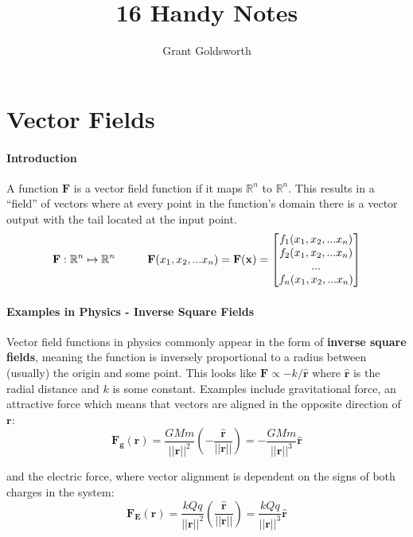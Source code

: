 \documentclass{article}
\title{16 Handy Notes}
\author{Grant Goldsworth}
\date{}
\begin{document}
\maketitle

\newcommand{\parf}[2]{\frac{\partial #1}{\partial #2}}

\section*{Vector Fields}
\paragraph{Introduction} A function $\mathbf{F}$ is a vector field function if it maps $\mathbb{R}^n$ to $\mathbb{R}^n$. This results in a ``field'' of vectors where at every point in the function's domain there is a vector output with the tail located at the input point.
\[ 
    \mathbf{F}: \mathbb{R}^n \mapsto \mathbb{R}^n \hspace{.4in}
    \mathbf{F}(x_1,x_2,...x_n) = \mathbf{F}(\mathbf{x}) = 
    \begin{bmatrix}
        f_1(x_1,x_2,...x_n) \\
        f_2(x_1,x_2,...x_n) \\
        ... \\
        f_n(x_1,x_2,...x_n)
    \end{bmatrix}
\]
\paragraph{Examples in Physics - Inverse Square Fields} Vector field functions in physics commonly appear in the form of \textbf{inverse square fields}, meaning the function is inversely proportional to a radius between (usually) the origin and some point. This looks like $\mathbf{F} \propto -k/\mathbf{\hat{r}}$ where $\mathbf{\hat{r}}$ is the radial distance and $k$ is some constant. Examples include gravitational force, an attractive force which means that vectors are aligned in the opposite direction of $\mathbf{r}$:
\[ \mathbf{F_g}(\mathbf{r}) = \frac{GMm}{||\mathbf{r}||^2}(-\frac{\mathbf{\hat{r}}}{||\mathbf{r}||}) = -\frac{GMm}{||\mathbf{r}||^3}\mathbf{\hat{r}}\]

and the electric force, where vector alignment is dependent on the signs of both charges in the system:
\[ \mathbf{F_E}(\mathbf{r}) = \frac{kQq}{||\mathbf{r}||^2}(\frac{\mathbf{\hat{r}}}{||\mathbf{r}||}) = \frac{kQq}{||\mathbf{r}||^3}\mathbf{\hat{r}}\]
\end{document}
